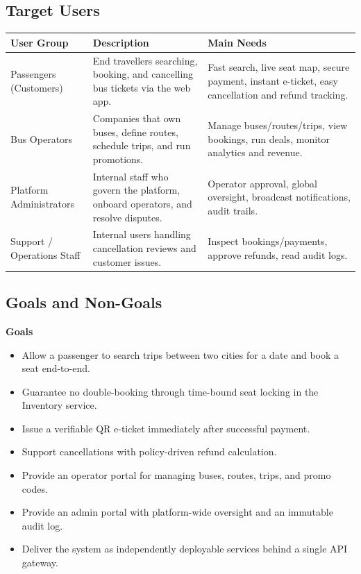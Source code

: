 \documentclass[11pt,a4paper]{article}
\newcommand{\rowstyle}{\rowcolor{headergray}}
\begin{document}
\subsection{Target Users}
\begin{longtable}{p{3.2cm} Y Y}
\toprule
\rowstyle \textbf{User Group} & \textbf{Description} & \textbf{Main Needs} \\
\midrule
\endhead
Passengers (Customers) & End travellers searching, booking, and cancelling bus tickets via the web app. & Fast search, live seat map, secure payment, instant e-ticket, easy cancellation and refund tracking. \\
Bus Operators & Companies that own buses, define routes, schedule trips, and run promotions. & Manage buses/routes/trips, view bookings, run deals, monitor analytics and revenue. \\
Platform Administrators & Internal staff who govern the platform, onboard operators, and resolve disputes. & Operator approval, global oversight, broadcast notifications, audit trails. \\
Support / Operations Staff & Internal users handling cancellation reviews and customer issues. & Inspect bookings/payments, approve refunds, read audit logs. \\
\bottomrule
\end{longtable}

\subsection{Goals and Non-Goals}
\textbf{Goals}
\begin{itemize}[leftmargin=1.4em]
  \item Allow a passenger to search trips between two cities for a date and book a seat end-to-end.
  \item Guarantee no double-booking through time-bound seat locking in the Inventory service.
  \item Issue a verifiable QR e-ticket immediately after successful payment.
  \item Support cancellations with policy-driven refund calculation.
  \item Provide an operator portal for managing buses, routes, trips, and promo codes.
  \item Provide an admin portal with platform-wide oversight and an immutable audit log.
  \item Deliver the system as independently deployable services behind a single API gateway.
\end{itemize}
\end{document}
